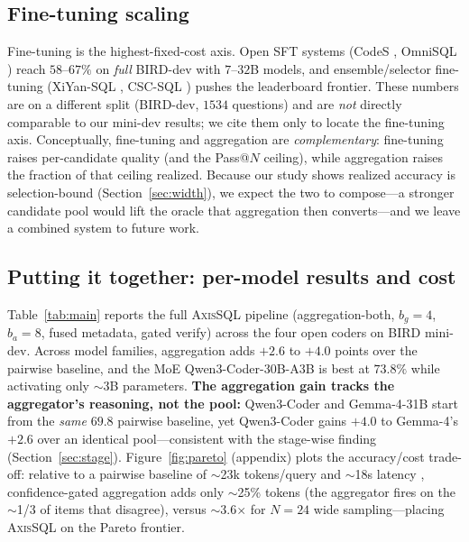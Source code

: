\documentclass{article}
\newcommand{\sys}{\textsc{AxisSQL}\xspace}
\begin{document}
\subsection{Fine-tuning scaling}
\label{sec:finetune}

Fine-tuning is the highest-fixed-cost axis. Open SFT systems (CodeS \citep{li2024codes}, OmniSQL \citep{li2025omnisql}) reach $58$--$67\%$ on \emph{full} BIRD-dev with $7$--$32$B models, and ensemble/selector fine-tuning (XiYan-SQL \citep{liu2025xiyan}, CSC-SQL \citep{sheng2025cscsql}) pushes the leaderboard frontier. These numbers are on a different split (BIRD-dev, $1534$ questions) and are \emph{not} directly comparable to our mini-dev results; we cite them only to locate the fine-tuning axis. Conceptually, fine-tuning and aggregation are \emph{complementary}: fine-tuning raises per-candidate quality (and the Pass@$N$ ceiling), while aggregation raises the fraction of that ceiling realized. Because our study shows realized accuracy is selection-bound (Section~\ref{sec:width}), we expect the two to compose---a stronger candidate pool would lift the oracle that aggregation then converts---and we leave a combined system to future work.

\subsection{Putting it together: per-model results and cost}
\label{sec:main}

Table~\ref{tab:main} reports the full \sys{} pipeline (aggregation-both, $b_g\!=\!4$, $b_a\!=\!8$, fused metadata, gated verify) across the four open coders on BIRD mini-dev. Across model families, aggregation adds $+2.6$ to $+4.0$ points over the pairwise baseline, and the MoE Qwen3-Coder-30B-A3B is best at $73.8\%$ while activating only $\sim$3B parameters. \textbf{The aggregation gain tracks the aggregator's reasoning, not the pool:} Qwen3-Coder and Gemma-4-31B start from the \emph{same} $69.8$ pairwise baseline, yet Qwen3-Coder gains $+4.0$ to Gemma-4's $+2.6$ over an identical pool---consistent with the stage-wise finding (Section~\ref{sec:stage}). Figure~\ref{fig:pareto} (appendix) plots the accuracy/cost trade-off: relative to a pairwise baseline of $\sim$23k tokens/query and $\sim$18s latency \citep{li2026deepeye}, confidence-gated aggregation adds only $\sim$25\% tokens (the aggregator fires on the $\sim$1/3 of items that disagree), versus $\sim$3.6$\times$ for $N{=}24$ wide sampling---placing \sys{} on the Pareto frontier.
\end{document}
